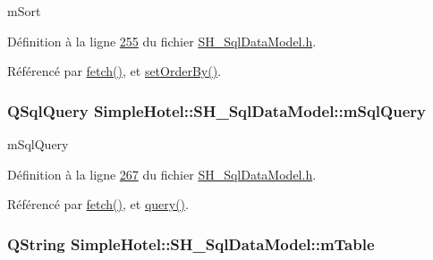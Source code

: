 m\-Sort 



Définition à la ligne \hyperlink{SH__SqlDataModel_8h_source_l00255}{255} du fichier \hyperlink{SH__SqlDataModel_8h_source}{S\-H\-\_\-\-Sql\-Data\-Model.\-h}.



Référencé par \hyperlink{classSimpleHotel_1_1SH__SqlDataModel_ab8b74a08f668025c11c5446d4e4b469b}{fetch()}, et \hyperlink{classSimpleHotel_1_1SH__SqlDataModel_a73ff28608bc0585fc8987e7a6ff907bb}{set\-Order\-By()}.

\hypertarget{classSimpleHotel_1_1SH__SqlDataModel_a6dec49c799f534f4b19902e6eb1c99a7}{
\subsubsection[{m\-Sql\-Query}]{\setlength{\rightskip}{0pt plus 5cm}Q\-Sql\-Query Simple\-Hotel\-::\-S\-H\-\_\-\-Sql\-Data\-Model\-::m\-Sql\-Query\hspace{0.3cm}{\ttfamily [private]}}}\label{classSimpleHotel_1_1SH__SqlDataModel_a6dec49c799f534f4b19902e6eb1c99a7}


m\-Sql\-Query 



Définition à la ligne \hyperlink{SH__SqlDataModel_8h_source_l00267}{267} du fichier \hyperlink{SH__SqlDataModel_8h_source}{S\-H\-\_\-\-Sql\-Data\-Model.\-h}.



Référencé par \hyperlink{classSimpleHotel_1_1SH__SqlDataModel_ab8b74a08f668025c11c5446d4e4b469b}{fetch()}, et \hyperlink{classSimpleHotel_1_1SH__SqlDataModel_a5fb2e1fb1be51d27475ba5da8a4e68ec}{query()}.

\hypertarget{classSimpleHotel_1_1SH__SqlDataModel_a567dcf9f5f9088ef90238d86272b3121}{
\subsubsection[{m\-Table}]{\setlength{\rightskip}{0pt plus 5cm}Q\-String Simple\-Hotel\-::\-S\-H\-\_\-\-Sql\-Data\-Model\-::m\-Table\hspace{0.3cm}{\ttfamily [private]}}}\label{classSimpleHotel_1_1SH__SqlDataModel_a567dcf9f5f9088ef90238d86272b3121}


